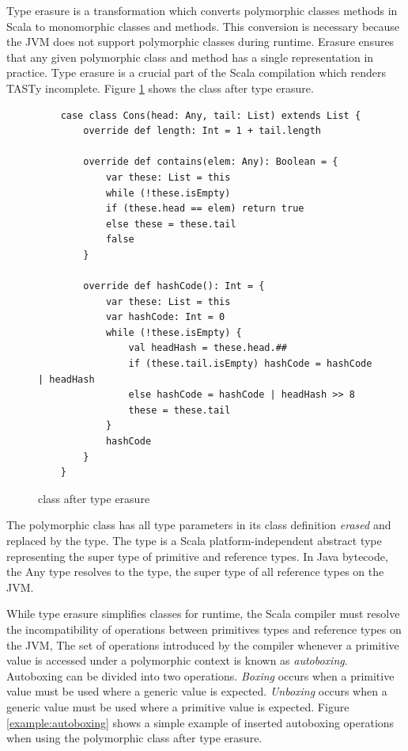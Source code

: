 Type erasure\cite{java:generics} is a transformation which converts polymorphic classes methods in Scala to monomorphic classes and methods. 
This conversion is necessary because the JVM does not support polymorphic classes during runtime.
Erasure ensures that any given polymorphic class and method has a single representation in practice.
Type erasure is a crucial part of the Scala compilation which renders TASTy incomplete.
Figure \ref{example:erase-cons} shows the  class after type erasure.

\begin{figure}[!htb]
	\begin{verbatim}
	case class Cons(head: Any, tail: List) extends List {
		override def length: Int = 1 + tail.length
			
		override def contains(elem: Any): Boolean = {
			var these: List = this
			while (!these.isEmpty) 
			if (these.head == elem) return true
			else these = these.tail
			false
		}
			
		override def hashCode(): Int = {
			var these: List = this
			var hashCode: Int = 0
			while (!these.isEmpty) {
				val headHash = these.head.##
				if (these.tail.isEmpty) hashCode = hashCode | headHash
				else hashCode = hashCode | headHash >> 8
				these = these.tail	
			}
			hashCode
		}
	}		
	\end{verbatim}
	\caption{ class after type erasure}
	\label{example:erase-cons}
\end{figure}

The polymorphic  class has all type parameters in its class definition \textit{erased} and replaced by the  type.
The  type is a Scala platform-independent\cite{scala:overview} abstract type representing the super type of primitive and reference types.
In Java bytecode, the {Any} type resolves to the  type, the super type of all reference types on the JVM.

While type erasure simplifies classes for runtime, the Scala compiler must resolve the incompatibility of operations between primitives types and reference types on the JVM\cite{java:vm-spec},
The set of operations introduced by the compiler whenever a primitive value is accessed under a polymorphic context is known as \textit{autoboxing}\cite{java:autoboxing}. 
Autoboxing can be divided into two operations.
\textit{Boxing} occurs when a primitive value must be used where a generic value is expected.
\textit{Unboxing} occurs when a generic value must be used where a primitive value is expected.
Figure \ref{example:autoboxing} shows a simple example of inserted autoboxing operations when using the polymorphic  class after type erasure.

